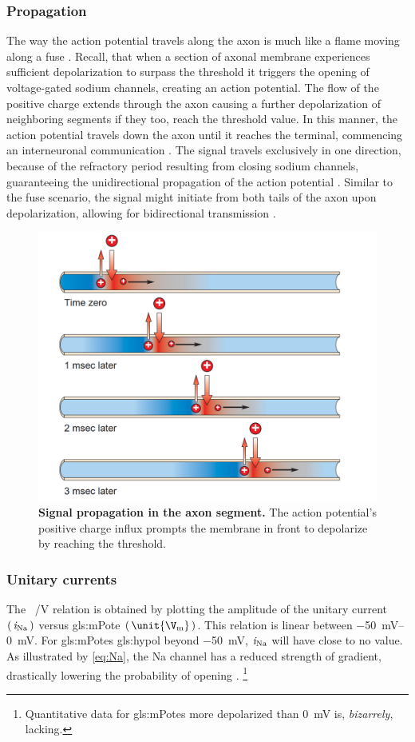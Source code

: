 \documentclass[class={myRUCProject}, crop=false]{standalone}
\begin{document}

\subsubsection{Propagation}

The way the action potential travels along the axon is much like a flame moving along a fuse \cite{wood1996neuroscience}. Recall, that when a section of axonal membrane experiences sufficient depolarization to surpass the threshold it triggers the opening of voltage-gated sodium channels, creating an action potential. The flow of the positive charge extends through the axon causing a further depolarization of neighboring segments if they too, reach the threshold value. In this manner, the action potential travels down the axon until it reaches the terminal, commencing an interneuronal communication \cite{wood1996neuroscience}. The signal travels exclusively in one direction, because of the refractory period resulting from closing sodium channels, guaranteeing the unidirectional propagation of the action potential \cite{Hammond2015ch4}. Similar to the fuse scenario, the signal might initiate from both tails of the axon upon depolarization, allowing for bidirectional transmission \cite{wood1996neuroscience}.

\begin{figure}[H]
  \centering
  \includegraphics[width=0.4\linewidth]{Pictures/Svet/Screenshot (903).png}
  \caption{\textbf{Signal propagation in the axon segment.} The action potential's positive charge influx prompts the membrane in front to depolarize by reaching the threshold.}\label{fig:cond}
\end{figure}

\subsubsection{Unitary currents}
The \unit[per-mode = symbol]{\ucur\sodium\per\V} relation is obtained by plotting the amplitude of the unitary current \(\left(\,\mathit{i}_\mathrm{Na}\,\right)\) versus \gls{gls:mPote} \(\br{\unit{\V\membrane}}\). This relation is linear between \qtyrange{-50}{0}{\mV}. For \glspl{gls:mPote} \gls{gls:hypol} beyond \qty{-50}{\mV}, \(\mathit{i}_\mathrm{Na}\) will have close to no value. As illustrated by \cref{eq:Na}, the \gls{Na} channel has a reduced strength of gradient, drastically lowering the probability of opening \cite{Hammond2015ch4}.
\footnote{Quantitative data for \glspl{gls:mPote} more depolarized than \qty{0}{\mV} is, \emph{bizarrely}, lacking.}
 
\end{document}
